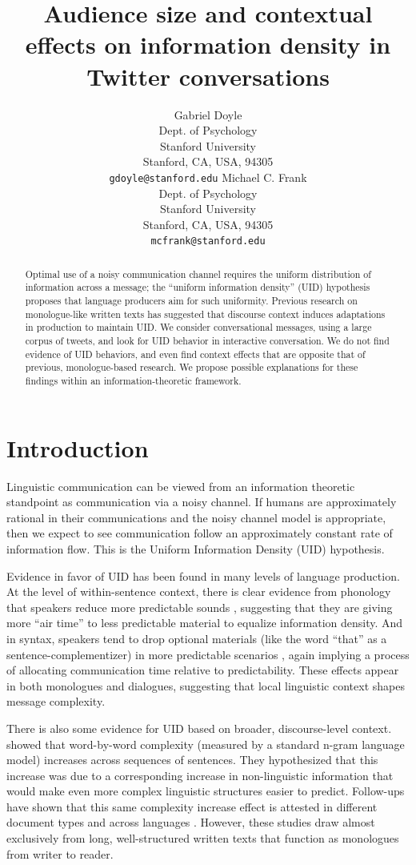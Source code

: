 \documentclass[11pt,letterpaper]{article}
\title{Audience size and contextual effects on information density in Twitter conversations}
\author{Gabriel Doyle\\
Dept. of Psychology\\
Stanford University\\
Stanford, CA, USA, 94305\\
{\tt gdoyle@stanford.edu}
	  \And
          Michael C. Frank\\
Dept. of Psychology\\
Stanford University\\
Stanford, CA, USA, 94305\\
{\tt mcfrank@stanford.edu}
}
\date{}
\begin{document}
\maketitle
\begin{abstract}
Optimal use of a noisy communication channel requires the uniform distribution of information across a message; the ``uniform information density'' (UID) hypothesis proposes that language producers aim for such uniformity. Previous research on monologue-like written texts has suggested that discourse context induces adaptations in production to maintain UID.  We consider conversational messages, using a large corpus of tweets, and look for UID behavior in interactive conversation.  We do not find evidence of UID behaviors, and even find context effects that are opposite that of previous, monologue-based research.  We propose possible explanations for these findings within an information-theoretic framework.

\end{abstract}

\section{Introduction}

Linguistic communication can be viewed from an information theoretic standpoint as communication via a noisy channel.  If humans are approximately rational in their communications and the noisy channel model is appropriate, then we expect to see communication follow an approximately constant rate of information flow.  This is the Uniform Information Density (UID) hypothesis.

Evidence in favor of UID has been found in many levels of language production. At the level of within-sentence context, there is clear evidence from phonology that speakers reduce more predictable sounds \cite{aylett2004,aylett2006,bell2003,demberg2012}, suggesting that they are giving more ``air time'' to less predictable material to equalize information density. And in syntax, speakers tend to drop optional materials (like the word ``that'' as a sentence-complementizer) in more predictable scenarios \cite{levy2007,frank2008,jaeger2010}, again implying a process of allocating communication time relative to predictability. These effects appear in both monologues and dialogues, suggesting that local linguistic context shapes message complexity.

There is also some evidence for UID based on broader, discourse-level context.   showed that word-by-word complexity (measured by a standard n-gram language model) increases across sequences of sentences. They hypothesized that this increase was due to a corresponding increase in non-linguistic information that would make even more complex linguistic structures easier to predict. Follow-ups have shown that this same complexity increase effect is attested in different document types and across languages \cite{genzel2003,qian2012}. However, these studies draw almost exclusively from long, well-structured written texts that function as monologues from writer to reader.  
\end{document}
